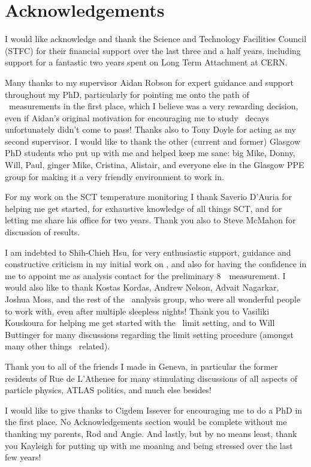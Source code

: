 \chapter*{Acknowledgements}
I would like acknowledge and thank the Science and Technology Facilities Council
(STFC) for their financial support over the last three and a half years,
including support for a fantastic two years spent on Long Term Attachment at CERN.

Many thanks to my supervisor Aidan Robson for expert guidance and support throughout my
PhD, particularly for pointing me onto the path of \ZZ\ measurements in the first
place, which I believe was a very rewarding decision, even if Aidan's original
motivation for encouraging me to study \ZZ\ decays unfortunately didn't come to
pass! 
Thanks also to Tony
Doyle for acting as my second supervisor.
I would like to thank the other (current and former) Glasgow PhD students who put up with me and
helped keep me sane: big Mike, Donny, Will, Paul, ginger Mike, Cristina,
Alistair, and everyone else in the Glasgow PPE group for making it a very
friendly environment to work in.

For my work on the SCT temperature monitoring I thank Saverio D'Auria
for helping me get started, for exhaustive knowledge of all things SCT, and for
letting me share his office for two years. Thank you also to Steve McMahon for
discussion of results.

I am indebted to Shih-Chieh Hsu, for very enthusiastic
support, guidance and constructive criticism in my initial work on \ZZ, and
also for having the confidence in me to appoint me as analysis contact for the
preliminary 8~\tev\ measurement. I would also like to thank Kostas Kordas,
Andrew Nelson, Advait Nagarkar, Joshua Moss, and the rest of the \ZZ\ analysis
group, who were all wonderful people to work with, even after multiple sleepless
nights! Thank you to Vasiliki Kouskoura for helping me get started with the
\TGC\ limit setting, and to Will Buttinger for many discussions regarding the
limit setting procedure (amongst many other things \ZZ\ related).

Thank you to all of the friends I made in Geneva, in particular the former
residents of Rue de L'Athenee for many stimulating discussions of all aspects of
particle physics, ATLAS politics, and much else besides!

I would like to give thanks to Cigdem Issever for encouraging me to do a PhD in the first
place. No Acknowledgements section would be complete without me
thanking my parents, Rod and Angie. And lastly, but by no means least, thank you Kayleigh for putting up with
me moaning and being stressed over the last few years!
